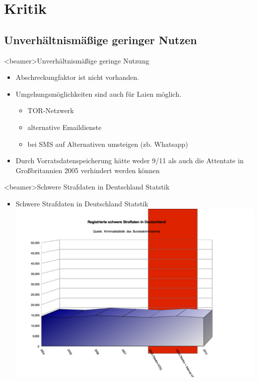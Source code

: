 \section{Kritik}
  \subsection*{Unverhältnismäßige geringer Nutzen}
    \begin{frame}<beamer>{Unverhältnismäßige geringe Nutzung}
      \begin{itemize}
        \item
          Abschreckungfaktor ist nicht vorhanden.
        \item
         Umgehungsmöglichkeiten sind auch für Laien möglich.
        \begin{itemize}
          \item TOR-Netzwerk
          \item alternative Emaildienste
          \item bei SMS auf Alternativen umsteigen (zb. Whatsapp)
        \end{itemize}
        \item Durch Vorratsdatenspeicherung hätte weder 9/11 als auch die Attentate in Großbritannien 2005 verhindert werden können
      \end{itemize}
    \end{frame}

\begin{frame}<beamer>{Schwere Strafdaten in Deutschland Statstik}
\begin{itemize}
        \item Schwere Strafdaten in Deutschland Statstik
        \includegraphics[height=1\textheight]{sections/img/schwere_verbrechen_in_DE.png}
    \end{itemize}
    \end{frame}
    
